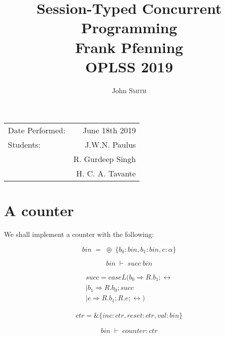 \documentclass{article}
\title{Session-Typed Concurrent Programming \\ Frank Pfenning \\ OPLSS 2019} %
\author{John \textsc{Smith}} %
\begin{document}
\maketitle %

\begin{center}
\begin{tabular}{l r}
Date Performed: & June 18th 2019 \\ %
Students: & J.W.N. Paulus  \\
& R. Gurdeep Singh \\ %
& H. C. A. Tavante
\end{tabular}
\end{center}



\section{A counter}

We shall implement a counter with the following:

\[
\; bin\; =\; \oplus\; \{ b_0: bin, b_1:bin, e:\alpha \}\; 
\]

\[
\; bin\; \vdash\; succ\; bin\; 
\]

\begin{equation}
\begin{split}
succ = caseL( b_0 \Rightarrow R . b_1; \leftrightarrow \\
            | b_1 \Rightarrow R . b_0; succ \\
            | e \Rightarrow R . b_1; R . e; \leftrightarrow )
\end{split}
\end{equation}

\begin{equation}
\begin{split}
ctr = \& \{ inc:ctr, reset:ctr, val:bin \}
\end{split}
\end{equation}

\[
\; bin\; \vdash\; counter:ctr\; 
\]
\end{document}

